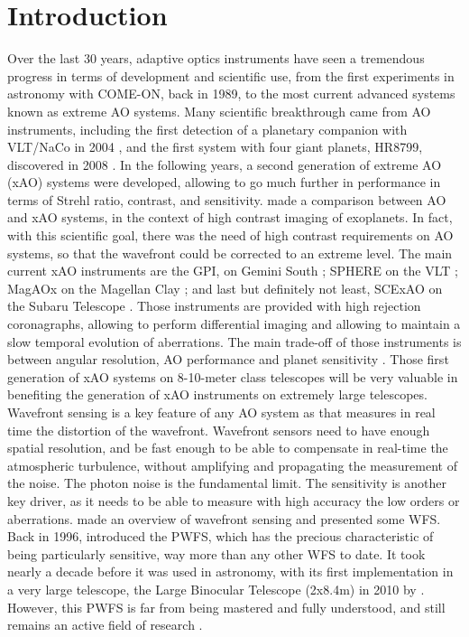 \documentclass[twocolumn]{aastex62}
\begin{document}


\section{Introduction} \label{sec:intro}

Over the last 30 years, adaptive optics instruments have seen a tremendous progress in terms of development and scientific use, from the first experiments in astronomy with COME-ON, back in 1989, to the most current advanced systems known as extreme AO systems. Many scientific breakthrough came from AO instruments, including the first detection of a planetary companion with VLT/NaCo in 2004 \citep{chauvin2004}, and the first system with four giant planets, HR8799, discovered in 2008 \citep{Marois2008}. In the following years, a second generation of extreme AO (xAO) systems were developed, allowing to go much further in performance in terms of Strehl ratio, contrast, and sensitivity. \cite{Milli2016} made a comparison between AO and xAO systems, in the context of high contrast imaging of exoplanets. In fact, with this scientific goal, there was the need of high contrast requirements on AO systems, so that the wavefront could be corrected to an extreme level. The main current xAO instruments are the GPI, on Gemini South \citep{GPIMacintosh2014,GPIMacintosh2018}; SPHERE on the VLT \citep{BeuzitSPHERE2008}; MagAOx on the Magellan Clay \citep{Males2018MagAOx}; and last but definitely not least, SCExAO on the Subaru Telescope \citep{GuyonSCExAO2010}. 
Those instruments are provided with high rejection coronagraphs, allowing to perform differential imaging and allowing to maintain a slow temporal evolution of aberrations. The main trade-off of those instruments is between angular resolution, AO performance and planet sensitivity \citep{Milli2016}.
Those first generation of xAO systems on 8-10-meter class telescopes will be very valuable in benefiting the generation of xAO instruments on extremely large telescopes.\\

Wavefront sensing is a key feature of any AO system as that measures in real time the distortion of the wavefront. Wavefront sensors need to have enough spatial resolution, and be fast enough to be able to compensate in real-time the atmospheric turbulence, without amplifying and propagating the measurement of the noise. The photon noise is the fundamental limit. The sensitivity is another key driver, as it needs to be able to measure with high accuracy the low orders or aberrations. \cite{Rousset1999} made an overview of wavefront sensing and presented some WFS. 
Back in 1996, \cite{Ragazzoni1996} introduced the PWFS, which has the precious characteristic of being particularly sensitive, way more than any other WFS to date. 
It took nearly a decade before it was used in astronomy, with its first implementation in a very large telescope, the Large Binocular Telescope (2x8.4m) in 2010 by \cite{Esposito2010LBT}. 
However, this PWFS is far from being mastered and fully understood, and still remains an active field of research \citep{Deo2019gain, Chambouleyron2020}.
\end{document}
